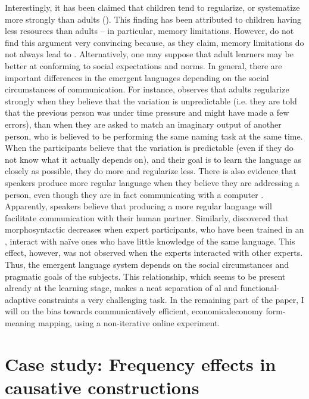 \documentclass[output=paper]{langsci/langscibook}
\begin{document}
Interestingly, it has been claimed that children tend to regularize, or systematize more strongly than adults (\citealt{HudsonKamNewport2009}). This finding has been attributed to children having less  resources than adults – in particular, memory limitations. However, \citet{SmithEtAl2017} do not find this argument very convincing because, as they claim, memory limitations do not always lead to . Alternatively, one may suppose that adult learners may be better at conforming to social expectations and norms. In general, there are important differences in the emergent languages depending on the social circumstances of communication. For instance, \citet{Perfors2016} observes that adults regularize strongly when they believe that the variation is unpredictable (i.e. they are told that the previous person was under time pressure and might have made a few errors), than when they are asked to match an imaginary output of another person, who is believed to be performing the same naming task at the same time. When the participants believe that the variation is predictable (even if they do not know what it actually depends on), and their goal is to learn the language as closely as possible, they do  more and regularize less. There is also evidence that speakers produce more regular language when they believe they are addressing a person, even though they are in fact communicating with a computer \citep{FehérEtAl2016}. Apparently, speakers believe that producing a more regular language will facilitate communication with their human partner. Similarly, \citet{Little2011} discovered that morphosyntactic  decreases when expert participants, who have been trained in an , interact with naïve ones who have little knowledge of the same language. This effect, however, was not observed when the experts interacted with other experts. Thus, the emergent language system depends on the social circumstances and pragmatic goals of the subjects. This relationship, which seems to be present already at the learning stage, makes a neat separation of al and functional-adaptive constraints a very challenging task.  
\newpage
In the remaining part of the paper, I will  on the bias towards communicatively efficient, economical\si{economy} form-meaning mapping, using a non-iterative online experiment.

\section{Case study: Frequency effects in causative constructions}\label{sec:levshina:3}
\end{document}
